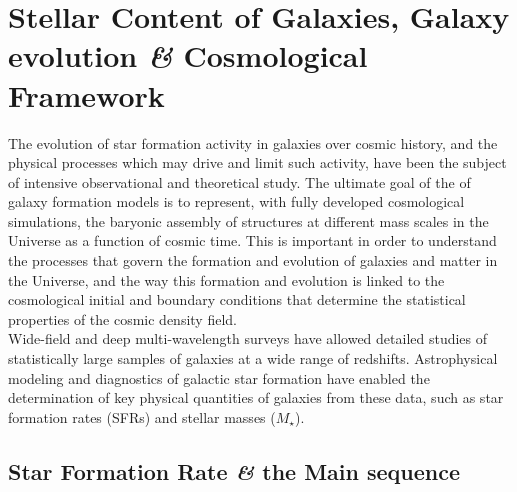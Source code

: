 \chapter{Stellar Content of Galaxies, Galaxy evolution \textit{\&} Cosmological Framework}
\label{chp:SM+ScR}
\captionsetup{width=0.75\textwidth}

The evolution of star formation activity in galaxies over cosmic history, and the physical processes which may drive and limit such activity, have been the subject of intensive observational and theoretical study.
The ultimate goal of the of galaxy formation models is to represent, with fully developed cosmological simulations, the baryonic assembly of structures at different mass scales in the Universe as a function of cosmic time. This is important in order to understand the processes that govern the formation and evolution of galaxies and matter in the Universe, and the way this formation and evolution is linked to the cosmological initial and boundary conditions that determine the statistical properties of the cosmic density field. \\
Wide-field and deep multi-wavelength surveys have allowed detailed studies of statistically large samples of galaxies at a wide range of redshifts. Astrophysical modeling and diagnostics of galactic star formation have enabled the determination\cite{MadauDickinson2014} of key physical quantities of galaxies from these data, such as star formation rates (SFRs) and stellar masses ($M_\star$).

\section{Star Formation Rate \textit{\&} the Main sequence}

